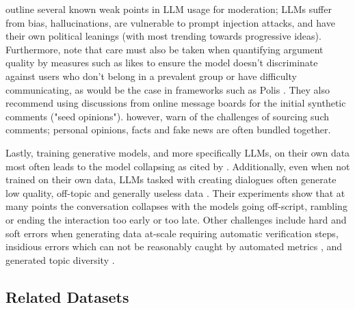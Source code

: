 \cite{small-polis-llm} outline several known weak points in LLM usage for moderation; LLMs suffer from bias, hallucinations, are vulnerable to prompt injection attacks, and have their own political leanings (with most trending towards progressive ideas). Furthermore, \cite{vecchi-2021-towards} note that care must also be taken when quantifying argument quality by measures such as likes to ensure the model doesn't discriminate against users who don't belong in a prevalent group or have difficulty communicating, as would be the case in frameworks such as Polis \cite{small2021polis}. They also recommend using discussions from online message boards for the initial synthetic comments ("seed opinions"). \cite{vecchi-2021-towards} however, warn of the challenges of sourcing such comments; personal opinions, facts and fake news are often bundled together.

Lastly, training generative models, and more specifically LLMs, on their own data most often leads to the model collapsing \cite{alemohammad2023selfconsuminggenerativemodelsmad, shumailov2024curserecursiontraininggenerated} as cited by \cite{ulmer2024bootstrappingllmbasedtaskorienteddialogue}. Additionally, even when not trained on their own data, LLMs tasked with creating dialogues often generate low quality, off-topic and generally useless data \cite{ulmer2024bootstrappingllmbasedtaskorienteddialogue}. Their experiments show that at many points the conversation collapses with the models going off-script, rambling or ending the interaction too early or too late. Other challenges include hard and soft errors when generating data at-scale \cite{lambert2024selfdirectedsyntheticdialoguesrevisions, ulmer2024bootstrappingllmbasedtaskorienteddialogue} requiring automatic verification steps, insidious errors which can not be reasonably caught by automated metrics \cite{lambert2024selfdirectedsyntheticdialoguesrevisions, ulmer2024bootstrappingllmbasedtaskorienteddialogue}, and generated topic diversity \cite{lambert2024selfdirectedsyntheticdialoguesrevisions}.


\subsection{Related Datasets}
\label{sec:related:datasets}


